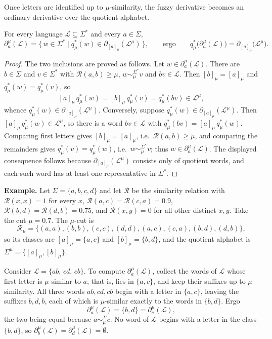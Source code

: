 Once letters are identified up to
$\mu$-similarity, the fuzzy derivative becomes an ordinary derivative over the
quotient alphabet.

\begin{theorem}\label{the:quotient-fuzzy-derivative}
For every language $\mathcal{L}\subseteq\Sigma^{*}$ and every $a\in\Sigma$,
\[
\partial_a^{\mu}(\mathcal{L})
= \{\,w\in\Sigma^{*}\mid q_\mu^{*}(w)\in\partial_{[a]_\mu}(\mathcal{L}^{\mu})\,\},
\qquad\text{ergo}\qquad
q_\mu^{*}\bigl(\partial_a^{\mu}(\mathcal{L})\bigr)=\partial_{[a]_\mu}\bigl(\mathcal{L}^{\mu}\bigr).
\]
\end{theorem}

\begin{proof}
The two inclusions are proved as follows. Let $w\in\partial_a^{\mu}(\mathcal{L})$. There are
$b\in\Sigma$ and $v\in\Sigma^{*}$ with $\mathcal{R}(a,b)\ge\mu$,
$w\sim_\mu^{\Sigma^{*}} v$ and $bv\in\mathcal{L}$. Then $[b]_\mu=[a]_\mu$ and
$q_\mu^{*}(w)=q_\mu^{*}(v)$, so
\[
[a]_\mu\, q_\mu^{*}(w)=[b]_\mu\, q_\mu^{*}(v)=q_\mu^{*}(bv)\in\mathcal{L}^{\mu},
\]
whence $q_\mu^{*}(w)\in\partial_{[a]_\mu}(\mathcal{L}^{\mu})$. Conversely, suppose
$q_\mu^{*}(w)\in\partial_{[a]_\mu}(\mathcal{L}^{\mu})$. Then
$[a]_\mu\, q_\mu^{*}(w)\in\mathcal{L}^{\mu}$, so there is a word $bv\in\mathcal{L}$
with $q_\mu^{*}(bv)=[a]_\mu\, q_\mu^{*}(w)$. Comparing first letters gives
$[b]_\mu=[a]_\mu$, i.e.\ $\mathcal{R}(a,b)\ge\mu$, and comparing the remainders gives
$q_\mu^{*}(v)=q_\mu^{*}(w)$, i.e.\ $w\sim_\mu^{\Sigma^{*}} v$; thus
$w\in\partial_a^{\mu}(\mathcal{L})$. The displayed consequence follows because
$\partial_{[a]_\mu}(\mathcal{L}^{\mu})$ consists only of quotient words, and each
such word has at least one representative in $\Sigma^{*}$.
\end{proof}

\noindent\textbf{Example.}
Let $\Sigma=\{a,b,c,d\}$ and let $\mathcal{R}$ be the similarity relation with
$\mathcal{R}(x,x)=1$ for every $x$, $\mathcal{R}(a,c)=\mathcal{R}(c,a)=0.9$,
$\mathcal{R}(b,d)=\mathcal{R}(d,b)=0.75$, and $\mathcal{R}(x,y)=0$ for all other
distinct $x,y$. Take the cut $\mu=0.7$. The $\mu$-cut is
\[
\mathcal{R}_\mu=\{(a,a),(b,b),(c,c),(d,d),(a,c),(c,a),(b,d),(d,b)\},
\]
so its classes are $[a]_\mu=\{a,c\}$ and $[b]_\mu=\{b,d\}$, and the quotient alphabet
is $\Sigma^{\mu}=\{[a]_\mu,[b]_\mu\}$.

Consider $\mathcal{L}=\{ab,\,cd,\,cb\}$. To compute $\partial_a^{\mu}(\mathcal{L})$,
collect the words of $\mathcal{L}$ whose first letter is $\mu$-similar to $a$,
that is, lies in $\{a,c\}$, and keep their suffixes up to $\mu$-similarity. All
three words $ab,cd,cb$ begin with a letter in $\{a,c\}$, leaving the suffixes
$b,d,b$, each of which is $\mu$-similar exactly to the words in $\{b,d\}$. Ergo
\[
\partial_a^{\mu}(\mathcal{L})=\{b,d\}=\partial_c^{\mu}(\mathcal{L}),
\]
the two being equal because $a\sim_\mu^{\Sigma} c$. No word of $\mathcal{L}$ begins
with a letter in the class $\{b,d\}$, so
$\partial_b^{\mu}(\mathcal{L})=\partial_d^{\mu}(\mathcal{L})=\emptyset$.

